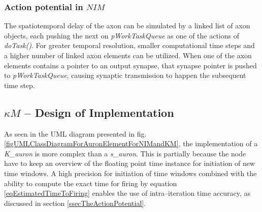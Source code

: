 		\subsubsection{Action potential in $NIM$}
		The spatiotemporal delay of the axon can be simulated by a linked list of axon objects, each pushing the next on \emph{pWorkTaskQueue} as one of the actions of \emph{doTask()}.
		For greater temporal resolution, smaller computational time steps and a higher number of linked axon elements can be utilized.
		When one of the axon elements contains a pointer to an output synapse, that synapse pointer is pushed to \emph{pWorkTaskQueue},
			causing synaptic transmission to happen the subsequent time step.

		
		



	\subsection{$\kappa M$ -- Design of Implementation}
		As seen in the UML diagram presented in fig. \ref{figUMLClassDiagramForAuronElementForNIMandKM}, the implementation of a \emph{K\_auron} 
			is more complex than a \emph{s\_auron}.
		This is partially because the node have to keep an overview of the floating point time instance for initiation of new time windows.
		A high precision for initiation of time windows combined with the ability to compute the exact time for firing 
			by equation \ref{eqEstimatedTimeToFiring} enables the use of intra--iteration time accuracy, as discussed in section \ref{ssecTheActionPotential}.
		
